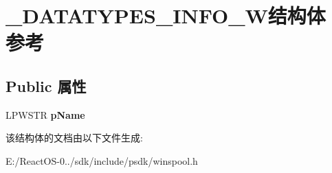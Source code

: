\hypertarget{struct___d_a_t_a_t_y_p_e_s___i_n_f_o__1_w}{}\section{\+\_\+\+D\+A\+T\+A\+T\+Y\+P\+E\+S\+\_\+\+I\+N\+F\+O\+\_\+W结构体 参考}
\label{struct___d_a_t_a_t_y_p_e_s___i_n_f_o__1_w}
\subsection*{Public 属性}
\begin{DoxyCompactItemize}
\item 
\mbox{\label{struct___d_a_t_a_t_y_p_e_s___i_n_f_o__1_w_a4a398b3cb152daa49b09ce5e8d6aa806}} 
L\+P\+W\+S\+TR {\bfseries p\+Name}
\end{DoxyCompactItemize}


该结构体的文档由以下文件生成\+:\begin{DoxyCompactItemize}
\item 
E\+:/\+React\+O\+S-\/0../sdk/include/psdk/winspool.\+h\end{DoxyCompactItemize}
